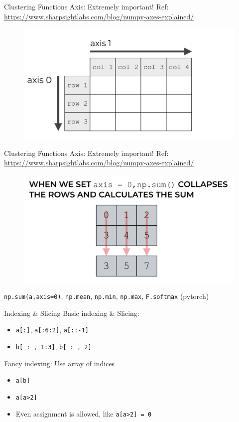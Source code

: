\documentclass{../TexTemplate/myslide}
\begin{document}
\begin{frame}[fragile]{Clustering Functions}
Axis: Extremely important! Ref: \url{https://www.sharpsightlabs.com/blog/numpy-axes-explained/}
\begin{figure}
\centering
\includegraphics[width=0.8\linewidth]{fig/axis1.png}
\end{figure}
\end{frame}

\begin{frame}[fragile]{Clustering Functions}
Axis: Extremely important! Ref: \url{https://www.sharpsightlabs.com/blog/numpy-axes-explained/}
\begin{figure}
\centering
\includegraphics[width=0.8\linewidth]{fig/axis2.png}
\end{figure}
\verb'np.sum(a,axis=0)', \verb'np.mean', \verb'np.min', \verb'np.max', \verb'F.softmax' (pytorch)
\end{frame}

\begin{frame}[fragile]{Indexing \& Slicing}
Basic indexing \& Slicing:
\begin{itemize}
	\item \verb'a[:]', \verb'a[:6:2]', \verb'a[::-1]'
	\item \verb'b[ : , 1:3]', \verb'b[ : , 2]'
\end{itemize}
Fancy indexing: Use array of indices
\begin{itemize}
	\item \verb'a[b]'
	\item \verb'a[a>2]'
	\item Even assignment is allowed, like \verb'a[a>2] = 0'
\end{itemize}
\end{frame}
\end{document}
